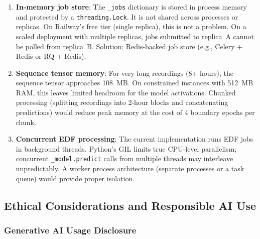 \documentclass[10pt]{article}
\begin{document}
\begin{enumerate}
  \item \textbf{In-memory job store}: The \texttt{\_jobs} dictionary is stored in process memory and protected by a \texttt{threading.Lock}. It is not shared across processes or replicas. On Railway's free tier (single replica), this is not a problem. On a scaled deployment with multiple replicas, jobs submitted to replica~A cannot be polled from replica~B. Solution: Redis-backed job store (e.g., Celery + Redis or RQ + Redis).

  \item \textbf{Sequence tensor memory}: For very long recordings (8+ hours), the sequence tensor approaches 108~MB. On constrained instances with 512~MB RAM, this leaves limited headroom for the model activations. Chunked processing (splitting recordings into 2-hour blocks and concatenating predictions) would reduce peak memory at the cost of 4 boundary epochs per chunk.

  \item \textbf{Concurrent EDF processing}: The current implementation runs EDF jobs in background threads. Python's GIL limits true CPU-level parallelism; concurrent \texttt{\_model.predict} calls from multiple threads may interleave unpredictably. A worker process architecture (separate processes or a task queue) would provide proper isolation.
\end{enumerate}

\subsection{Ethical Considerations and Responsible AI Use}
\label{sec:ethicalConsiderations}

\subsubsection{Generative AI Usage Disclosure}
\label{sec:generativeAIDisclosure}
\end{document}
